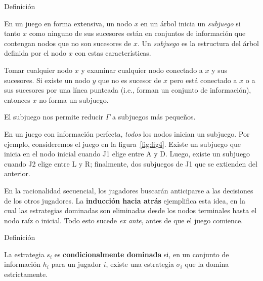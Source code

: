 \documentclass[12pt]{scrartcl}
\begin{document}
\begin{mybox}{Definición}
	\begin{defi}
		En un juego en forma extensiva, un nodo $x$ en un árbol inicia un \textit{subjuego} si tanto $x$ como ninguno de sus sucesores están en conjuntos de información que contengan nodos que no son sucesores de $x$. Un \textit{subjuego} es la estructura del árbol definida por el nodo $x$ con estas características. 
	\end{defi}
	\label{def:def5}
\end{mybox}

Tomar cualquier nodo $x$ y examinar cualquier nodo conectado a $x$ y sus sucesores. Si existe un nodo $y$ que no es sucesor de $x$ pero está conectado a $x$ o a sus sucesores por una línea punteada (i.e., forman un conjunto de información), entonces $x$ no forma un subjuego. %


El subjuego nos permite reducir $\Gamma$ a subjuegos más pequeños.

En un juego con información perfecta, \textit{todos} los nodos inician un subjuego. Por ejemplo, consideremos el juego en la figura~\ref{fig:fig4}. Existe un subjuego que inicia en el nodo inicial cuando J1 elige entre A y D. Luego, existe un subjuego cuando J2 elige entre L y R; finalmente, dos subjuegos de J1 que se extienden del anterior. 

En la racionalidad secuencial, los jugadores buscarán anticiparse a las decisiones de los otros jugadores. La \textbf{inducción hacia atrás} ejemplifica esta idea, en la cual las estrategias dominadas son eliminadas desde los nodos terminales hasta el nodo raíz o inicial. Todo esto sucede \textit{ex ante}, antes de que el juego comience.

\begin{mybox}{Definición}
	\begin{defi}
		La estrategia $s_i$ es \textbf{condicionalmente dominada} si, en un conjunto de información $h_i$ para un jugador $i$, existe una estrategia $\sigma_i$ que la domina estrictamente.
	\end{defi}
	\label{def:def8}
\end{mybox}
\end{document}
